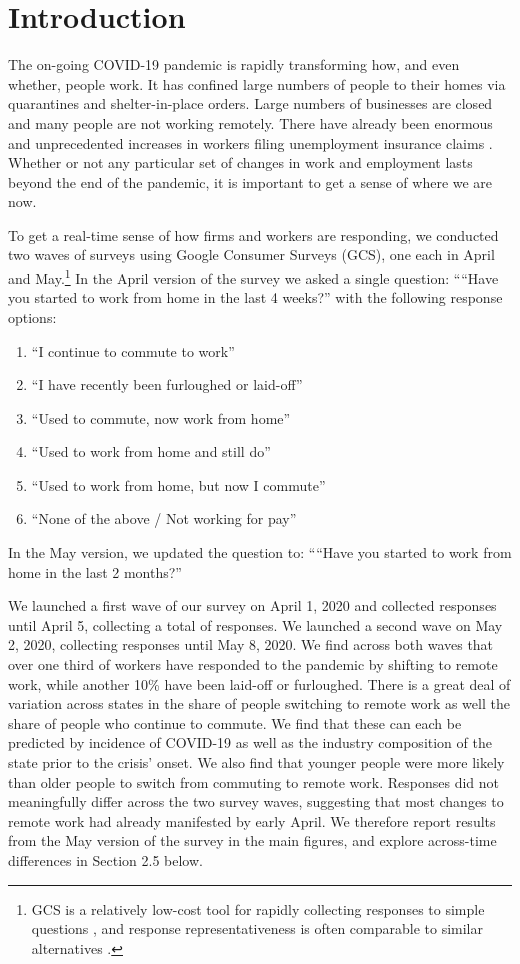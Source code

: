 \documentclass[12pt]{article}
\newcommand{\covid}{COVID-19}
\begin{document}
\onehalfspacing 

\section{Introduction}
The on-going \covid{} pandemic is rapidly transforming how, and even whether, people work. It has confined large numbers of people to their homes via quarantines and shelter-in-place orders. Large numbers of businesses are closed and many people are not working remotely. There have already been enormous and unprecedented increases in workers filing unemployment insurance claims \citep{goldsmith2020}. Whether or not any particular set of changes in work and employment lasts beyond the end of the pandemic, it is important to get a sense of where we are now.

To get a real-time sense of how firms and workers are responding, we conducted two waves of surveys using Google Consumer Surveys (GCS), one each in April and May.\footnote{
GCS is a relatively low-cost tool for rapidly collecting responses to simple questions \cite{stephens2014hands}, and response representativeness is often comparable to similar alternatives \citep{santoso2016survey, brynjolfsson2019using}.}  In the April version of the survey we asked a single question:
````Have you started to work from home in the last 4 weeks?''
with the following response options: 
\begin{enumerate} 
\item ``I continue to commute to work''
\item ``I have recently been furloughed or laid-off''
\item ``Used to commute, now work from home''   
\item ``Used to work from home and still do''       
\item ``Used to work from home, but now I commute''
\item ``None of the above / Not working for pay''
\end{enumerate} 
In the May version, we updated the question to: ````Have you started to work from home in the last 2 months?''

We launched a first wave of our survey on April 1, 2020 and collected responses until April 5, collecting a total of \numObsold{} responses. We launched a second wave on May 2, 2020, collecting \numObs{} responses until May 8, 2020. We find across both waves that over one third of workers have responded to the pandemic by shifting to remote work, while another 10\% have been laid-off or furloughed.
There is a great deal of variation across states in the share of people switching to remote work as well the share of people who continue to commute. We find that these can each be predicted by incidence of COVID-19 as well as the industry composition of the state prior to the crisis' onset.  We also find that younger people were more likely than older people to switch from commuting to remote work. Responses did not meaningfully differ across the two survey waves, suggesting that most changes to remote work had already manifested by early April. We therefore report results from the May version of the survey in the main figures, and explore across-time differences in Section 2.5 below. 
\end{document}
